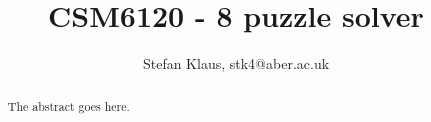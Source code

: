 \documentclass[journal]{IEEEtran}
\begin{document}
%
\title{CSM6120 - 8 puzzle solver }
%
%
%

\author{Stefan Klaus, stk4@aber.ac.uk}

% 
%













\maketitle


\begin{abstract}
The abstract goes here.
\end{abstract}
\end{document}
